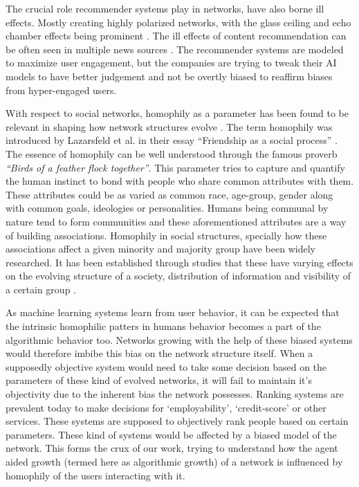 The crucial role recommender systems play in networks, have also borne ill effects. Mostly creating highly polarized networks, with the glass ceiling and echo chamber effects being prominent \cite{stoica2018algorithmic}. The ill effects of content recommendation can be often seen in multiple news sources \cite{youtubefeed2020,guardianselfharm,youtuberabbit2020}. The recommender systems are modeled to maximize user engagement, but the companies are trying to tweak their AI models to have better judgement and not be overtly biased to reaffirm biases from hyper-engaged users.

With respect to social networks, homophily as a parameter has been found to be relevant in shaping how network structures evolve \cite{dong2017structural,mcpherson2001birds}. The term homophily was introduced by Lazarsfeld et al. in their essay ``Friendship as a social process'' \cite{lazarsfeld1954friendship}. The essence of homophily can be well understood through the famous proverb \textit{``Birds of a feather flock together''}. This parameter tries to capture and  quantify the human instinct to bond with people who share common attributes with them. These attributes could be as varied as common race, age-group, gender along with common goals, ideologies or personalities. Humans being communal by nature tend to form communities and these aforementioned attributes are a way of building associations. Homophily in social structures, specially how these associations affect a given minority and majority group have been widely researched. It has been established through studies that these have varying effects on the evolving structure of a society, distribution of information and visibility of a certain group \cite{stoica2018algorithmic,avin2015homophily,mcpherson2001birds,karimi2018homophily}. 

As machine learning systems learn from user behavior, it can be expected that the intrinsic homophilic patters in humans behavior becomes a part of the algorithmic behavior too. Networks growing with the help of these biased systems would therefore imbibe this bias on the network structure itself. When a supposedly objective system would need to take some decision based on the parameters of these kind of evolved networks, it will fail to maintain it's objectivity due to the inherent bias the network possesses. Ranking systems are prevalent today to make decisions for `employability', `credit-score' or other services. These systems are supposed to objectively rank people based on certain parameters. These kind of systems would be affected by a biased model of the network. This forms the crux of our work, trying to understand how the agent aided growth (termed here as algorithmic growth) of a network is influenced by homophily of the users interacting with it. 


